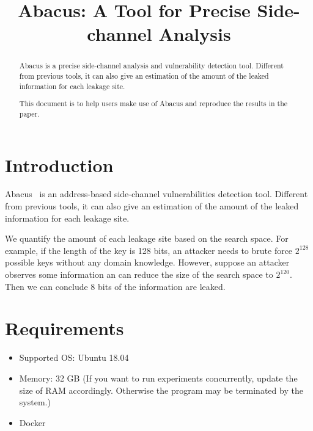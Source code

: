 \documentclass[10pt,conference]{IEEEtran}
\newcommand{\tool}{\textsf{Abacus}}
\begin{document}
\title{\tool{}: A Tool for Precise Side-channel Analysis}
\author{
}


\maketitle

\begin{abstract}
Abacus is a precise side-channel analysis and vulnerability detection
tool. Different from previous tools, it can also give an estimation
of the amount of the leaked information for each leakage site.

This document is to help users make use of Abacus and reproduce the
results in the paper.
\end{abstract}


\section{Introduction}
Abacus~\cite{bao2021abacus} is an address-based side-channel vulnerabilities detection tool. Different from previous tools, it can also give an estimation of the amount of the leaked information for each leakage site.

We quantify the amount of each leakage site based on the search space. For example, if the length of the key is 128 bits, an attacker needs to brute force $2^128$ possible keys without any domain knowledge. However, suppose an attacker observes some information an can reduce the size of the search space to $2^120$. Then we can conclude 8 bits of the information are leaked.

\section{Requirements}
\begin{itemize}
\item Supported OS: Ubuntu 18.04
\item Memory: 32 GB (If you want to run experiments concurrently, update the size of RAM
     accordingly. Otherwise the program may be terminated by the system.)
\item Docker
\end{itemize}
\end{document}
